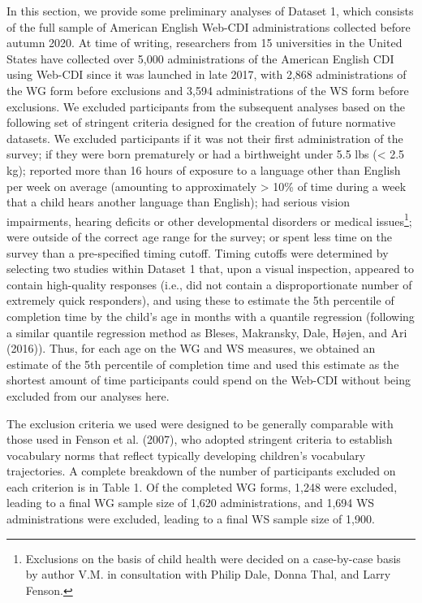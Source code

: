 \documentclass[
  english,
  ,man,floatsintext]{apa6}
\begin{document}
In this section, we provide some preliminary analyses of Dataset 1, which consists of the full sample of American English Web-CDI administrations collected before autumn 2020. At time of writing, researchers from 15 universities in the United States have collected over 5,000 administrations of the American English CDI using Web-CDI since it was launched in late 2017, with 2,868 administrations of the WG form before exclusions and 3,594 administrations of the WS form before exclusions. We excluded participants from the subsequent analyses based on the following set of stringent criteria designed for the creation of future normative datasets. We excluded participants if it was not their first administration of the survey; if they were born prematurely or had a birthweight under 5.5 lbs (\textless{} 2.5 kg); reported more than 16 hours of exposure to a language other than English per week on average (amounting to approximately \textgreater{} 10\% of time during a week that a child hears another language than English); had serious vision impairments, hearing deficits or other developmental disorders or medical issues\footnote{Exclusions on the basis of child health were decided on a case-by-case basis by author V.M. in consultation with Philip Dale, Donna Thal, and Larry Fenson.}; were outside of the correct age range for the survey; or spent less time on the survey than a pre-specified timing cutoff. Timing cutoffs were determined by selecting two studies within Dataset 1 that, upon a visual inspection, appeared to contain high-quality responses (i.e., did not contain a disproportionate number of extremely quick responders), and using these to estimate the 5th percentile of completion time by the child's age in months with a quantile regression (following a similar quantile regression method as Bleses, Makransky, Dale, Højen, and Ari (2016)). Thus, for each age on the WG and WS measures, we obtained an estimate of the 5th percentile of completion time and used this estimate as the shortest amount of time participants could spend on the Web-CDI without being excluded from our analyses here.

The exclusion criteria we used were designed to be generally comparable with those used in Fenson et al. (2007), who adopted stringent criteria to establish vocabulary norms that reflect typically developing children's vocabulary trajectories. A complete breakdown of the number of participants excluded on each criterion is in Table 1. Of the completed WG forms, 1,248 were excluded, leading to a final WG sample size of 1,620 administrations, and 1,694 WS administrations were excluded, leading to a final WS sample size of 1,900.
\end{document}
